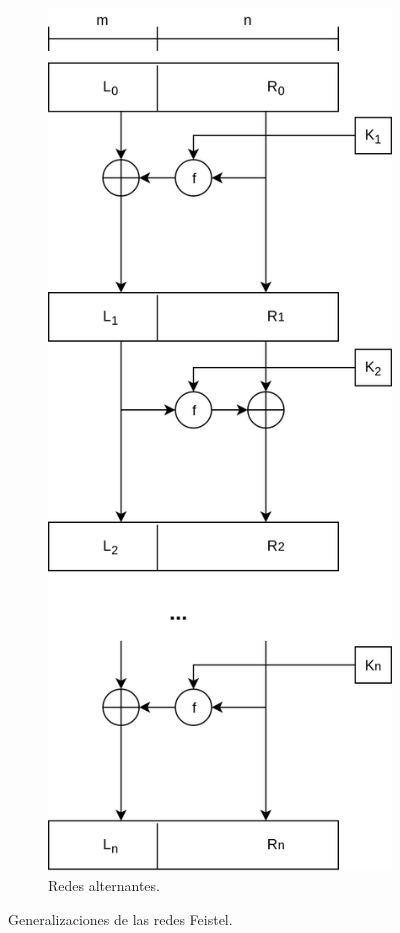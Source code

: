 \begin{figure}
\begin{subfigure}{0.45\textwidth}
\begin{center}
      \includegraphics[width=0.5\linewidth]
        {../../../../diagramas_comunes/redes_feistel/alternantes.png}
      \caption{Redes alternantes.}
      \label{feistel:alternantes}
    \end{center}
  \end{subfigure}
  \caption{Generalizaciones de las redes Feistel.}
  \label{feistel:generalizaciones}
\end{figure}
